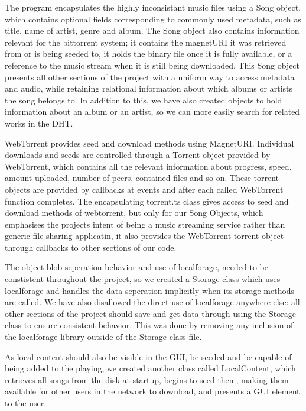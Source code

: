 The program encapsulates the highly inconsistant music files using a Song object,
which contains optional fields corresponding to commonly used metadata, 
such as title, name of artist, genre and album. 
The Song object also contains information relevant for the bittorrent system; 
it contains the magnetURI it was retrieved from or is being seeded to, 
it holds the binary file once it is fully available, 
or a reference to the music stream when it is still being downloaded.
This Song object presents all other sections of the project with a uniform way to access metadata and audio, 
while retaining relational information about which albums or artists the song belongs to. In addition to this, 
we have also created objects to hold information about an album or an artist, 
so we can more easily search for related works in the \acs{DHT}.
\newline

WebTorrent provides seed and download methods using MagnetURI.
Individual downloads and seeds are controlled through a Torrent object provided by WebTorrent,
which contains all the relevant information about progress, 
speed, amount uploaded, number of peers, contained files and so on.
These torrent objects are provided by callbacks at events
and after each called WebTorrent function completes.
The encapsulating torrent.ts class gives access to seed and download methods of webtorrent, 
but only for our Song Objects, which emphasises the projects intent of being a music streaming service 
rather than generic file sharing applicatin, 
it also provides the WebTorrent torrent object through callbacks to other sections of our code.
\newline

The object-blob seperation behavior and use of localforage,
needed to be constistent throughout the project, 
so we created a Storage class which uses localforage and handles the data seperation implicitly when its storage methods are called.
We have also disallowed the direct use of localforage anywhere else: all other sections of the project should save and get data through using the Storage class to ensure consistent behavior. 
This was done by removing any inclusion of the localforage library outside of the Storage class file.

As local content should also be visible in the \acs{GUI}, 
be seeded and be capable of being added to the playing,
we created another class called LocalContent,
which retrieves all songs from the disk at startup,
begins to seed them, making them available for other users in the network to download,
and presents a \acs{GUI} element to the user.
